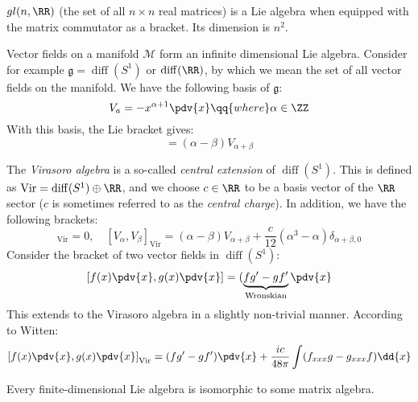 \documentclass{jknotes}
\begin{document}
\begin{eg}
    \(gl(n,\RR)\) (the set of all \(n\times n\) real matrices) is a Lie algebra when equipped with the matrix commutator as a bracket. Its dimension is \(n^2\).
\end{eg}
\begin{eg}
    Vector fields on a manifold \(\mathcal{M}\) form an infinite dimensional Lie algebra. Consider for example \(\mathfrak{g} = \operatorname{diff}(S^1)\) or \(\operatorname{diff}(\RR)\), by which we mean the set of all vector fields on the manifold. We have the following basis of \(\mathfrak{g}\):
    \begin{equation}
        V_a = - x^{\alpha+1}\pdv{x} \qq{where} \alpha\in\ZZ
    \end{equation}
    With this basis, the Lie bracket gives:
    \begin{equation}
        [V_\alpha,V_\beta] = (\alpha-\beta)V_{\alpha+\beta}
    \end{equation}
\end{eg}

\begin{eg}
    The \emph{Virasoro algebra} is a so-called \emph{central extension} of \(\operatorname{diff}(S^1)\). This is defined as \(\text{Vir} = \operatorname{diff}(S^1) \oplus \RR\), and we choose \(c\in\RR\) to be a basis vector of the \(\RR\) sector (\(c\) is sometimes referred to as the \emph{central charge}). In addition, we have the following brackets:
    \begin{equation}
        [V_\alpha,c]_{\text{Vir}} = 0,\quad
        [V_\alpha,V_\beta]_{\text{Vir}} = (\alpha-\beta)V_{\alpha+\beta} + \frac{c}{12}(\alpha^3-\alpha)\delta_{\alpha+\beta,0}
    \end{equation}
    Consider the bracket of two vector fields in \(\operatorname{diff}(S^1)\):
    \begin{equation}
        \left[ f(x)\pdv{x},g(x)\pdv{x} \right] = (\underbrace{fg'-gf'}_{\text{Wronskian}}\pdv{x}
    \end{equation}
    This extends to the Virasoro algebra in a slightly non-trivial manner. According to Witten:
    \begin{equation}
        \left[ f(x)\pdv{x},g(x)\pdv{x} \right]_{\text{Vir}} = (fg'-gf')\pdv{x}
        + \frac{ic}{48\pi}\int(f_{xxx}g-g_{xxx}f)\dd{x}
    \end{equation}
\end{eg}
\begin{theorem}[Ado]
    Every finite-dimensional Lie algebra is isomorphic to some matrix algebra.
\end{theorem}
\end{document}

